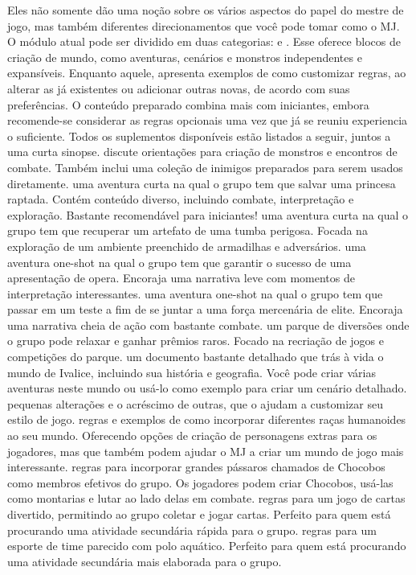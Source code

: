 Eles não somente dão uma noção sobre os vários aspectos do papel do mestre de jogo, mas também diferentes direcionamentos que você pode tomar como o MJ.
O módulo atual pode ser dividido em duas categorias:  e .
Esse oferece blocos de criação de mundo, como aventuras, cenários e monstros independentes e expansíveis.
Enquanto aquele, apresenta exemplos de como customizar regras, ao alterar as já existentes ou adicionar outras novas, de acordo com suas preferências.
O conteúdo preparado combina mais com iniciantes, embora recomende-se considerar as regras opcionais uma vez que já se reuniu experiencia o suficiente.
Todos os suplementos disponíveis estão listados a seguir, juntos a uma curta sinopse.
%
\newpage
%
{\large{}}
%
\vfill
%
 discute orientações para criação de monstros e encontros de combate.
Também inclui uma coleção de inimigos preparados para serem usados diretamente.
%
\vfill
%
 uma aventura curta na qual o grupo tem que salvar uma princesa raptada. 
Contém conteúdo diverso, incluindo combate, interpretação e exploração. Bastante recomendável para iniciantes!
%
\vfill
%
 uma aventura curta na qual o grupo tem que recuperar um artefato de uma tumba perigosa.
Focada na exploração de um ambiente preenchido de armadilhas e adversários.
%
\vfill
%
 uma aventura one-shot na qual o grupo tem que garantir o sucesso de uma apresentação de opera.
Encoraja uma narrativa leve com momentos de interpretação interessantes.
%
\vfill
%
 uma aventura one-shot na qual o grupo tem que passar em um teste a fim de se juntar a uma força mercenária de elite.
Encoraja uma narrativa cheia de ação com bastante combate.
%
\vfill
%
 um parque de diversões onde o grupo pode relaxar e ganhar prêmios raros.
Focado na recriação de jogos e competições do parque.
%
\vfill
%
 um documento bastante detalhado que trás à vida o mundo de Ivalice, incluindo sua história e geografia.
Você pode criar várias aventuras neste mundo ou usá-lo como exemplo para criar um cenário detalhado.
%
{\large\ofpar\ofrow{}}
%
\vfill
%
 pequenas alterações e o acréscimo de outras, que o ajudam a customizar seu estilo de jogo.
%
\vfill
%
 regras e exemplos de como incorporar diferentes raças humanoides ao seu mundo. 
Oferecendo opções de criação de personagens extras para os jogadores, mas que também podem ajudar o MJ a criar um mundo de jogo mais interessante.
%
\vfill
%
 regras para incorporar grandes pássaros chamados de Chocobos como membros efetivos do grupo. 
Os jogadores podem criar Chocobos, usá-las como montarias e lutar ao lado delas em combate.
%
\vfill
%
 regras para um jogo de cartas divertido, permitindo ao grupo coletar e jogar cartas.
Perfeito para quem está procurando uma atividade secundária rápida para o grupo.
%
\vfill
%
 regras para um esporte de time parecido com polo aquático.
Perfeito para quem está procurando uma atividade secundária mais elaborada para o grupo.
%
\clearpage